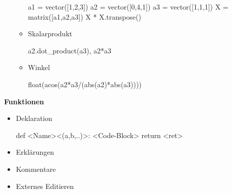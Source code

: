 \documentclass[a4paper,9pt,DIV15,twocolumn]{scrartcl}
\begin{document}
\begin{itemize}
\begin{itemize}
\begin{sagein}
a1 = vector([1,2,3])
a2 = vector([0,4,1])
a3 = vector([1,1,1])
X = matrix([a1,a2,a3])
X * X.transpose() 
\end{sagein}
\item Skalarprodukt
\begin{sagein}
a2.dot_product(a3), a2*a3
\end{sagein}
\item Winkel
\begin{sagein}
float(acos(a2*a3/(abs(a2)*abs(a3))))
\end{sagein}
\end{itemize}
\end{itemize}

\textbf{Funktionen}

\begin{itemize}
 \item Deklaration
\begin{sagein}
def <Name><(a,b,..)>:
    <Code-Block>
    return <ret>
\end{sagein}
\item Erklärungen
\item Kommentare
\item Externes Editieren
\end{itemize}
\end{document}
